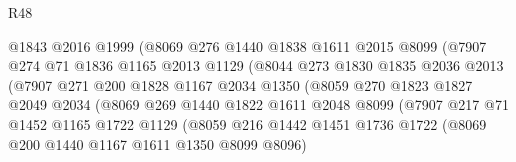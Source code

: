 \begin{lexlean}{R48}
\begin{coremodule}
                                @1843
                                @2016
                                @1999
                                (@8069
                                  @276
                                  @1440
                                  @1838
                                  @1611
                                  @2015
                                  @8099
                                  (@7907
                                    @274
                                    @71
                                    @1836
                                    @1165
                                    @2013
                                    @1129
                                    (@8044
                                      @273
                                      @1830
                                      @1835
                                      @2036
                                      @2013
                                      (@7907
                                        @271
                                        @200
                                        @1828
                                        @1167
                                        @2034
                                        @1350
                                        (@8059
                                          @270
                                          @1823
                                          @1827
                                          @2049
                                          @2034
                                          (@8069
                                            @269
                                            @1440
                                            @1822
                                            @1611
                                            @2048
                                            @8099
                                            (@7907
                                              @217
                                              @71
                                              @1452
                                              @1165
                                              @1722
                                              @1129
                                              (@8059
                                                @216
                                                @1442
                                                @1451
                                                @1736
                                                @1722
                                                (@8069 @200 @1440 @1167 @1611 @1350 @8099 @8096)

\end{coremodule}
\end{lexlean}
